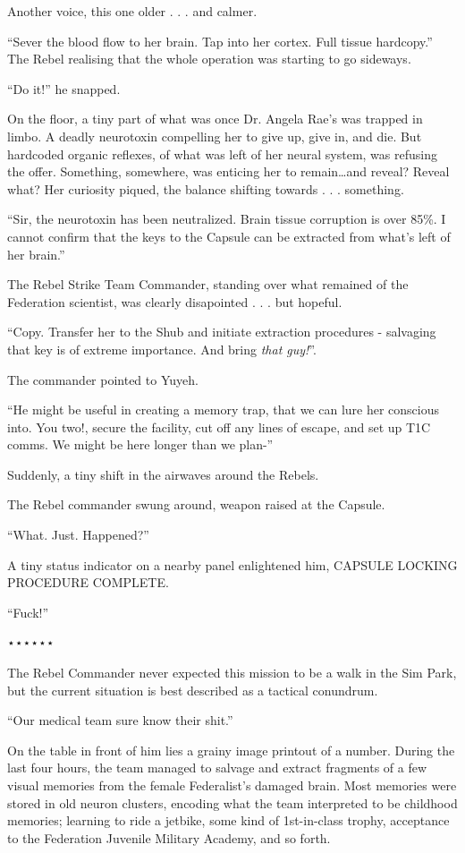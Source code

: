 \documentclass[smalldemyvopaper,11pt,twoside,onecolumn,openright,extrafontsizes]{memoir}
\begin{document}
 
  Another voice, this one older . . . and calmer.

 
  “Sever the blood flow to her brain. Tap into her cortex. Full tissue hardcopy.” The Rebel realising that the whole operation was starting to go sideways.

 
  “Do it!” he snapped.

 
  On the floor, a tiny part of what was once Dr. Angela Rae’s was trapped in limbo. A deadly neurotoxin compelling her to give up, give in, and die. But hardcoded organic reflexes, of what was left of her neural system, was refusing the offer. Something, somewhere, was enticing her to remain…and reveal? Reveal what? Her curiosity piqued, the balance shifting towards . . . something.

 
  “Sir, the neurotoxin has been neutralized. Brain tissue corruption is over 85\%. I cannot confirm that the keys to the Capsule can be extracted from what’s left of her brain.”

 
  The Rebel Strike Team Commander, standing over what remained of the Federation scientist, was clearly disapointed . . . but hopeful.

 
  “Copy. Transfer her to the Shub and initiate extraction procedures - salvaging that key is of extreme importance. And bring \textit{that guy!}”.

 
  The commander pointed to Yuyeh.

 
  “He might be useful in creating a memory trap, that we can lure her conscious into. You two!, secure the facility, cut off any lines of escape, and set up T1C comms. We might be here longer than we plan-”

 
  Suddenly, a tiny shift in the airwaves around the Rebels.

 
  The Rebel commander swung around, weapon raised at the Capsule.

 
  “What. Just. Happened?”

 A tiny status indicator on a nearby panel enlightened him, CAPSULE LOCKING PROCEDURE COMPLETE.

 
 “Fuck!”

⋆⋆⋆⋆⋆⋆

The Rebel Commander never expected this mission to be a walk in the Sim Park, but the current situation is best described as a tactical conundrum.

 
“Our medical team sure know their shit.”

 
  On the table in front of him lies a grainy image printout of a number. During the last four hours, the team managed to salvage and extract fragments of a few visual memories from the female Federalist’s damaged brain. Most memories were stored in old neuron clusters, encoding what the team interpreted to be childhood memories; learning to ride a jetbike, some kind of 1st-in-class trophy, acceptance to the Federation Juvenile Military Academy, and so forth.
\end{document}
